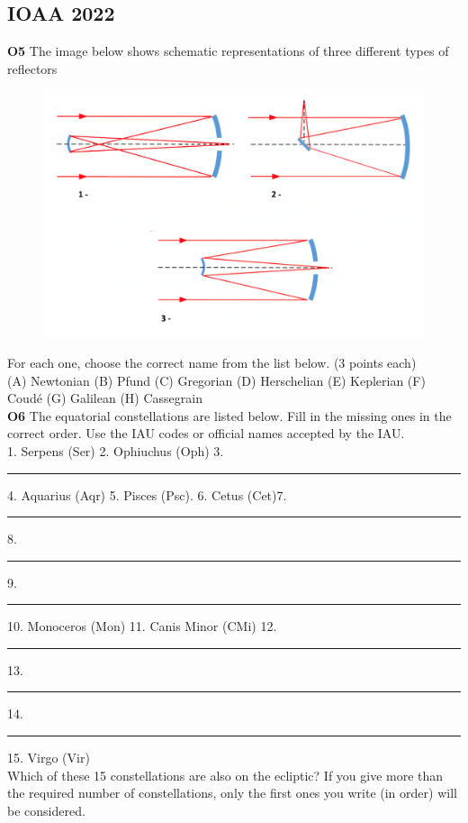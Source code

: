 \documentclass[a4paper,12pt]{extarticle}
\begin{document}
\subsection{IOAA 2022}
\textbf{O5} The image below shows schematic representations of three different types of reflectors
\begin{figure}[H]
	\centering
	\includegraphics[width=0.7\linewidth]{ioaa22_1.png}
\end{figure}
For each one, choose the correct name from the list below. (3 points each)\\
(A) Newtonian (B) Pfund (C) Gregorian (D) Herschelian (E) Keplerian (F) Coudé (G) Galilean (H) Cassegrain\\

\textbf{O6} The equatorial constellations are listed below. Fill in the missing ones in the correct order. Use the IAU codes or official names accepted by the IAU.\\

1. Serpens (Ser) 2. Ophiuchus (Oph) 3. \rule{1cm}{0.15mm} 4. Aquarius (Aqr) 5. Pisces (Psc).     6. Cetus  (Cet)7.\rule{1cm}{0.15mm}   8. \rule{1cm}{0.15mm} 9. \rule{1cm}{0.15mm} 10. Monoceros (Mon) 11. Canis Minor (CMi) 12. \rule{1cm}{0.15mm} 13. \rule{1cm}{0.15mm} 14. \rule{1cm}{0.15mm} 15. Virgo (Vir)\\
Which of these 15 constellations are also on the ecliptic? If you give more than the required number of constellations, only the first ones you write (in order) will be considered.\\
\end{document}
